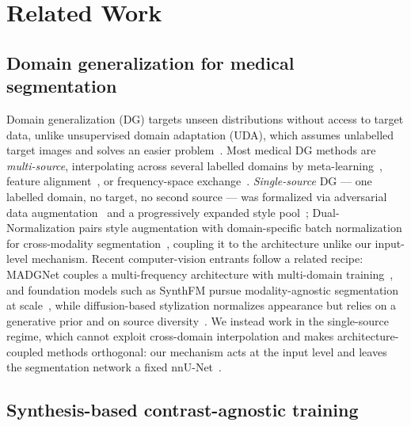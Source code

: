 \section{Related Work}
\label{sec:related}

\subsection{Domain generalization for medical segmentation}
\label{subsec:dg}

Domain generalization (DG) targets unseen distributions without access to
target data, unlike unsupervised domain adaptation (UDA), which assumes
unlabelled target images and solves an easier problem~\cite{shin2023sdcuda}.
Most medical DG methods are \emph{multi-source}, interpolating across several
labelled domains by meta-learning~\cite{li2018mldg}, feature
alignment~\cite{wang2020dofe}, or frequency-space
exchange~\cite{liu2021feddg}. \emph{Single-source} DG --- one labelled domain, no target, no second
source --- was formalized via adversarial data augmentation~\cite{qiao2020mada}
and a progressively expanded style pool~\cite{li2021pden}; Dual-Normalization
pairs style augmentation with domain-specific batch normalization for
cross-modality segmentation~\cite{zhou2022dualnorm}, coupling it to the
architecture unlike our input-level mechanism. Recent
computer-vision entrants follow a related recipe: MADGNet couples a
multi-frequency architecture with multi-domain training~\cite{nam2024madgnet},
and foundation models such as SynthFM pursue modality-agnostic segmentation at
scale~\cite{sengupta2025synthfm}, while diffusion-based stylization normalizes
appearance but relies on a generative prior and on source
diversity~\cite{bao2024structaware}. We instead work in the single-source
regime, which cannot exploit cross-domain interpolation and makes
architecture-coupled methods orthogonal: our mechanism acts at the input level
and leaves the segmentation network a fixed nnU-Net~\cite{isensee2021nnunet}.

\subsection{Synthesis-based contrast-agnostic training}
\label{subsec:synth}

